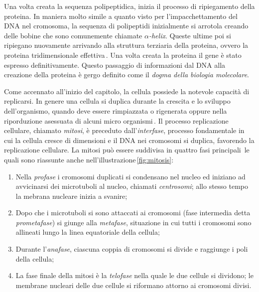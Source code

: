 Una volta creata la sequenza polipeptidica, inizia il processo di ripiegamento della proteina. In maniera molto simile a quanto visto per l'impacchettamento del DNA nel cromosoma, la sequenza di polipeptidi inizialmente si arrotola creando delle bobine che sono comunemente chiamate $\alpha$\textit{-helix}. Queste ultime poi si ripiegano nuovamente arrivando alla struttura terziaria della proteina, ovvero la proteina tridimensionale effettiva\,\cite{schulz2013principles}. Una volta creata la proteina il gene è stato espresso definitivamente. Questo passaggio di informazioni dal DNA alla creazione della proteina è gergo definito come il \textsl{dogma della biologia molecolare}.

Come accennato all'inizio del capitolo, la cellula possiede la notevole capacità di replicarsi. In genere una cellula si duplica durante la crescita e lo sviluppo dell'organismo, quando deve essere rimpiazzata o rigenerata oppure nella riporduzione asessuata di alcuni micro organismi\,\cite{bavle2014mitosis}. Il processo replicazione cellulare, chiamato \textsl{mitosi}, è preceduto dall'\textsl{interfase}, processo fondamentale in cui la cellula cresce di dimensioni e il DNA nei cromosomi si duplica, favorendo la replicazione cellulare. La mitosi può essere suddivisa in quattro fasi principali\,\cite{walczak2010mechanisms, bavle2014mitosis, li2020theoretical, sullivan2007finishing} le quali sono riassunte anche nell'illustrazione\,\ref{fig:mitosis}:
\begin{enumerate}
    \item Nella \textsl{profase} i cromosomi duplicati si condensano nel nucleo ed iniziano ad avvicinarsi dei microtuboli al nucleo, chiamati \textsl{centrosomi}; allo stesso tempo la mebrana nucleare inizia a svanire;
    \item Dopo che i microtuboli si sono attaccati ai cromosomi (fase intermedia detta \textsl{prometafase}) si giunge alla \textsl{metafase}, situazione in cui tutti i cromosomi sono allineati lungo la linea equatoriale della cellula;
    \item Durante l'\textsl{anafase}, ciascuna coppia di cromosomi si divide e raggiunge i poli della cellula;
    \item La fase finale della mitosi è la \textsl{telofase} nella quale le due cellule si dividono; le membrane nucleari delle due cellule si riformano attorno ai cromosomi divisi.
\end{enumerate}

